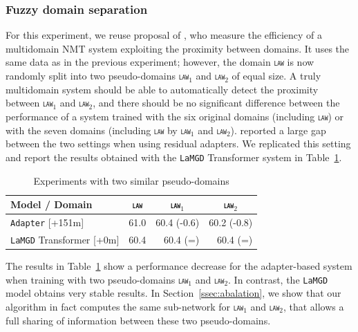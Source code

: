 \documentclass[11pt]{article}
\newcommand{\domain}[1]{\texttt{\textsc{#1}}}
\newcommand{\system}[1]{\texttt{{#1}}}
\begin{document}
\subsubsection{Fuzzy domain separation}
\label{ssec:fuzzy}
For this experiment, we reuse proposal of \citet{Pham21revisiting}, who measure the efficiency of a multidomain NMT system exploiting the proximity between domains. It uses the same data as in the previous experiment; however, the domain \domain{law} is now randomly split into two pseudo-domains \domain{law$_1$} and \domain{law$_2$} of equal size. A truly multidomain system should be able to automatically detect the proximity between \domain{law$_1$} and \domain{law$_2$}, and there should be no significant difference between the performance of a system trained with the six original domains (including \domain{law}) or with the seven domains (including \domain{law} by \domain{law$_1$} and \domain{law$_2$}). \citet{Pham21revisiting} reported a large gap between the two settings when using residual adapters. We replicated this setting and report the results obtained with the \system{LaMGD} Transformer system in Table~\ref{tab:fuzzy}. 

\begin{table}[h!]
  \centering
  \begin{tabular}{|p{4cm}|*{3}{r|}} \hline
    Model / Domain & \multicolumn{1}{c|}{\domain{law}} & \multicolumn{1}{c|}{\domain{law$_1$}} & \multicolumn{1}{c|}{\domain{law$_2$}} \\ \hline 
    \system{Adapter}   \hfill{\footnotesize[+151m]}  & 61.0 & 60.4 (-0.6) &  60.2 (-0.8) \\ 
    \system{LaMGD} Transformer   \hfill{\footnotesize[+0m]}  & 60.4 & 60.4 (=) & 60.4 (=) \\ 
    \hline
  \end{tabular}
  \caption{Experiments with two similar pseudo-domains }
  \label{tab:fuzzy}
\end{table}

The results in Table~\ref{tab:fuzzy} show a performance decrease for the adapter-based system when training with two pseudo-domains \domain{law$_1$} and \domain{law$_2$}. In contrast, the \system{LaMGD} model obtains very stable results. In Section~\ref{ssec:abalation}, we show that our algorithm in fact computes the same sub-network for \domain{law$_1$} and \domain{law$_2$}, that allows a full sharing of information between these two pseudo-domains.
\end{document}
